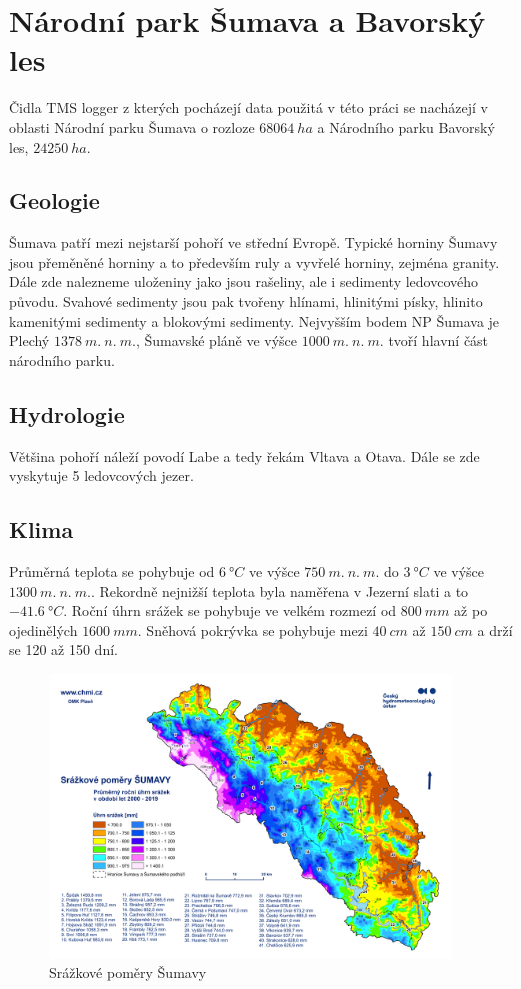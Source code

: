 \section{Národní park Šumava a Bavorský les} \label{chap:sumavabavorskyles}
Čidla TMS logger z kterých pocházejí data použitá v této práci se nacházejí v oblasti Národní parku Šumava o rozloze $\SI{68 064}{ha}$\cite{npsumava} a Národního parku Bavorský les, $\SI{24250}{ha}$.

\subsection{Geologie}
Šumava patří mezi nejstarší pohoří ve střední Evropě\cite{WildJan2004Cops}. Typické horniny Šumavy jsou přeměněné horniny a to především ruly a vyvřelé horniny, zejména granity. Dále zde nalezneme uloženiny jako jsou rašeliny, ale i sedimenty ledovcového původu. Svahové sedimenty jsou pak tvořeny hlínami, hlinitými písky, hlinito kamenitými sedimenty a blokovými sedimenty. Nejvyšším bodem NP Šumava je Plechý $\SI{1378}{m.\ n.\ m.}$, Šumavské pláně ve výšce $\SI{1000}{m.\ n.\ m.}$ tvoří hlavní část národního parku\cite{npsumava}. 

\subsection{Hydrologie}
Většina pohoří náleží povodí Labe a tedy řekám Vltava a Otava. Dále se zde vyskytuje 5 ledovcových jezer.

\subsection{Klima}
Průměrná teplota se pohybuje od $\SI{6}{\degree C}$ ve výšce $\SI{750}{m.\ n.\ m.}$ do $\SI{3}{\degree C}$ ve výšce $\SI{1300}{m.\ n.\ m.}$. Rekordně nejnižší teplota byla naměřena v Jezerní slati a to $\SI{-41.6}{\degree C}$. Roční úhrn srážek se pohybuje ve velkém rozmezí od $\SI{800}{mm}$ až po ojedinělých $\SI{1600}{mm}$. Sněhová pokrývka se pohybuje mezi $\SI{40}{cm}$ až $\SI{150}{cm}$ a drží se 120 až 150 dní. 

\begin{figure}
	\centering
	\includegraphics[width=0.95\textwidth]{img/ch1/srazkovepomerysumava.png}
	\caption{Srážkové poměry Šumavy\cite{srazkovepomerysumava}}
	\label{fig:srazkovepomerysumava}
\end{figure}

